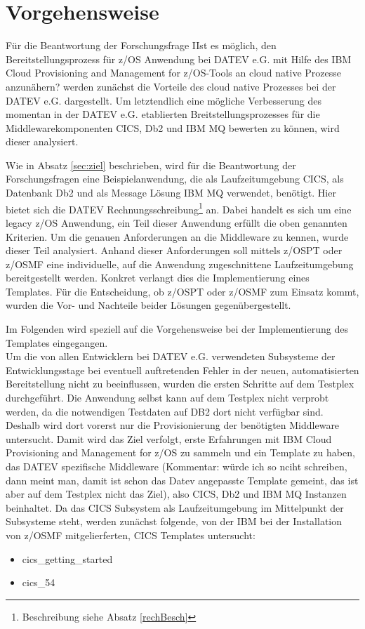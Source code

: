 \chapter{Vorgehensweise}\label{ch:vorgehensweise}
Für die Beantwortung der Forschungsfrage \glqq IIst es möglich, den Bereitstellungsprozess für z/OS Anwendung bei DATEV e.G. mit Hilfe des \glqq IBM Cloud Provisioning and Management for z/OS\grqq-Tools an cloud native Prozesse anzunähern?\grqq{} werden zunächst die Vorteile des cloud native Prozesses bei der DATEV e.G. dargestellt.
Um letztendlich eine mögliche Verbesserung des momentan in der DATEV e.G. etablierten Breitstellungsprozesses für die Middlewarekomponenten CICS, Db2 und IBM MQ bewerten zu können, wird dieser analysiert.

Wie in Absatz \ref{sec:ziel} beschrieben, wird für die Beantwortung der Forschungsfragen eine Beispielanwendung, die als Laufzeitumgebung CICS, als Datenbank Db2 und als Message Lösung IBM MQ verwendet, benötigt.
Hier bietet sich die \glqq DATEV Rechnungsschreibung\grqq{}\footnote{Beschreibung siehe Absatz \ref{rechBesch}} an.
Dabei handelt es sich um eine legacy z/OS Anwendung, ein Teil dieser Anwendung erfüllt die oben genannten Kriterien.
Um die genauen Anforderungen an die Middleware zu kennen, wurde dieser Teil analysiert.
Anhand dieser Anforderungen soll mittels z/OSPT oder z/OSMF eine individuelle, auf die Anwendung zugeschnittene Laufzeitumgebung bereitgestellt werden.
Konkret verlangt dies die Implementierung eines Templates.
Für die Entscheidung, ob z/OSPT oder z/OSMF zum Einsatz kommt, wurden die Vor- und Nachteile beider Lösungen gegenübergestellt.

Im Folgenden wird speziell auf die Vorgehensweise bei der Implementierung des Templates eingegangen.\\
Um die von allen Entwicklern bei DATEV e.G. verwendeten Subsysteme der Entwicklungsstage bei eventuell auftretenden Fehler in der neuen, automatisierten Bereitstellung nicht zu beeinflussen, wurden die ersten Schritte auf dem Testplex durchgeführt.
Die Anwendung selbst kann auf dem Testplex nicht verprobt werden, da die notwendigen Testdaten auf DB2 dort nicht verfügbar sind.
Deshalb wird dort vorerst nur die Provisionierung der benötigten Middleware untersucht.
Damit wird das Ziel verfolgt, erste Erfahrungen mit \glqq IBM Cloud Provisioning and Management for z/OS\grqq{} zu sammeln und ein Template zu haben, das DATEV spezifische Middleware (Kommentar: würde ich so nciht schreiben, dann meint man, damit ist schon das Datev angepasste Template gemeint, das ist aber auf dem Testplex nicht das Ziel), also CICS, Db2 und IBM MQ Instanzen beinhaltet. 
Da das CICS Subsystem als Laufzeitumgebung im Mittelpunkt der Subsysteme steht, werden zunächst folgende, von der IBM bei der Installation von z/OSMF mitgelierferten, CICS Templates untersucht:
\begin{itemize}
\item \glqq cics\_getting\_started\grqq
\item \glqq cics\_54\grqq
\end{itemize}

